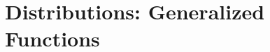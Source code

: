 \documentclass[../../main.tex]{subfiles}
\begin{document}
\chapter{Distributions: Generalized Functions}
\end{document}
